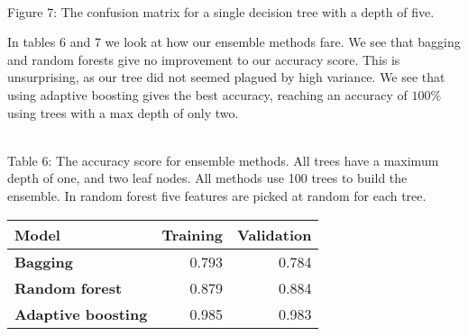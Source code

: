 \documentclass[11pt]{article}
\begin{document}
\begin{center}
\end{center}
{ \hspace*{\fill} \\}
Figure 7: The confusion matrix for a single decision tree with a depth of five.

In tables 6 and 7 we look at how our ensemble methods fare. We see that bagging and random forests give no improvement to our accuracy score. This is unsurprising, as our tree did not seemed plagued by high variance. We see that using adaptive boosting gives the best accuracy, reaching an accuracy of $100\%$ using trees with a max depth of only two.

{ \hspace*{\fill} \\}
Table 6: The accuracy score for ensemble methods. All trees have a maximum depth of one, and two leaf nodes. All methods use 100 trees to build the ensemble. In random forest five features are picked at random for each tree. 
\begin{table}[h!]
	\begin{center}
		\label{tab:table1}
		\begin{tabular}{l|r|r}
			\textbf{Model}                                                 	& \textbf{Training} & \textbf{Validation}
			\\ \hline
			\textbf{Bagging}                             		             & 0.793        & 0.784              \\ \hline
			\textbf{Random forest}                                		     & 0.879        & 0.884              \\ \hline
			\textbf{Adaptive boosting}   							    	 & 0.985        & 0.983              \\ \hline
		\end{tabular}
	\end{center}
\end{table}
\end{document}
